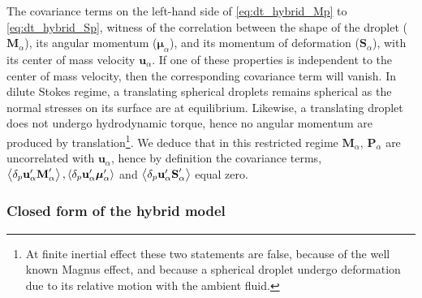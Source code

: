 The covariance terms on the left-hand side of \ref{eq:dt_hybrid_Mp} to \ref{eq:dt_hybrid_Sp}, witness of the correlation between the shape of the droplet ($\textbf{M}_\alpha$), its angular momentum ($\bm\mu_\alpha$), and its momentum of deformation ($\textbf{S}_\alpha$), with its center of mass velocity $\textbf{u}_\alpha$. 
If one of these properties is independent to the center of mass velocity, then the corresponding covariance term will vanish. 
In dilute Stokes regime, a translating spherical droplets remains spherical as the normal stresses on its surface are at equilibrium\citep{taylor1964deformation}. 
Likewise, a translating droplet does not undergo hydrodynamic torque, hence no angular momentum are produced by translation\footnote{At finite inertial effect these two statements are false, because of the well known Magnus effect, and because a spherical droplet undergo deformation due to its relative motion with the ambient fluid.}.
We deduce that in this restricted regime $\textbf{M}_\alpha$, $\textbf{P}_\alpha$ are uncorrelated with $\textbf{u}_\alpha$, hence by definition the covariance terms, $\left<\delta_{p} \textbf{u}_\alpha' \textbf{M}_\alpha'\right>,\left<\delta_{p} \textbf{u}_\alpha' \bm\mu_\alpha'\right>$ and $\left<\delta_{p} \textbf{u}_\alpha' \textbf{S}_\alpha'\right>$ equal zero. 





\subsubsection{Closed form of the hybrid model}

